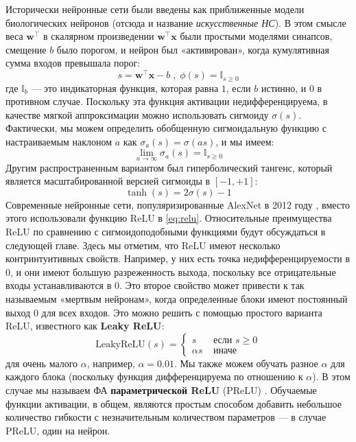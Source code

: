 Исторически нейронные сети были введены как приближенные модели биологических нейронов (отсюда и название \textit{искусственные НС}). В этом смысле веса $\mathbf{w}^\top$ в скалярном произведении $\mathbf{w}^\top \mathbf{x}$ были простыми моделями синапсов, смещение $b$ было порогом, и нейрон был «активирован», когда кумулятивная сумма входов превышала порог:
%
$$
s = \mathbf{w}^\top\mathbf{x}-b \;,\; \phi(s)= \mathbb{I}_{s \ge 0}
$$
%
где $\mathbb{I}_{b}$ — это индикаторная функция, которая равна $1$, если $b$ истинно, и $0$ в противном случае. Поскольку эта функция активации недифференцируема, в качестве мягкой аппроксимации можно использовать сигмоиду $\sigma(s)$. Фактически, мы можем определить обобщенную сигмоидальную функцию с настраиваемым наклоном $a$ как $\sigma_a(s) = \sigma(as)$, и мы имеем:
%
$$
\lim_{a \rightarrow \infty}\sigma_a(s)=\mathbb{I}_{s \ge 0}
$$
%
Другим распространенным вариантом был гиперболический тангенс, который является масштабированной версией сигмоиды в $[-1,+1]$:
%
$$
\tanh(s)=2\sigma(s)-1
$$
%
Современные нейронные сети, популяризированные AlexNet в 2012 году \cite{krizhevsky2012imagenet}, вместо этого использовали функцию ReLU в \eqref{eq:relu}. Относительные преимущества ReLU по сравнению с сигмоидоподобными функциями будут обсуждаться в следующей главе. Здесь мы отметим, что ReLU имеют несколько контринтуитивных свойств. Например, у них есть точка недифференцируемости в $0$, и они имеют большую разреженность выхода, поскольку все отрицательные входы устанавливаются в $0$. Это второе свойство может привести к так называемым «мертвым нейронам», когда определенные блоки имеют постоянный выход $0$ для всех входов. Это можно решить с помощью простого варианта ReLU, известного как \textbf{Leaky ReLU}:
%
\begin{equation}
\text{LeakyReLU}(s) = \begin{cases} s & \text{ если } s \ge 0 \\ \alpha s & \text{ иначе } \end{cases} 
\label{eq:leaky_relu}
\end{equation}
%
для очень малого $\alpha$, например, $\alpha = 0.01$. Мы также можем обучать разное $\alpha$ для каждого блока (поскольку функция дифференцируема по отношению к $\alpha$). В этом случае мы называем ФА \textbf{параметрической ReLU} (PReLU) \cite{he2015delving}. Обучаемые функции активации, в общем, являются простым способом добавить небольшое количество гибкости с незначительным количеством параметров — в случае PReLU, один на нейрон.

